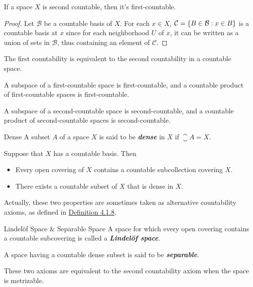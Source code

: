 \documentclass[12pt,a4paper]{article}
\begin{document}
    \begin{thm}
        If a space $X$ is second countable, then it's first-countable.
    \end{thm}
    \begin{proof}
        Let $\mathcal{B}$ be a countable basis of $X$. For each $x\in X$, $\mathcal{C}=\left\{B\in\mathcal{B}:x\in B\right\}$ is a countable basis at $x$ since for each neighborhood $U$ of $x$, it can be written as a union of sets in $\mathcal{B}$, thus containing an element of $\mathcal{C}$.
    \end{proof}
    \begin{remark}
        The first countability is equivalent to the second countability in a countable space.
    \end{remark}
    \hfill

    \begin{thm}
        A subspace of a first-countable space is first-countable, and a countable product of first-countable spaces is first-countable.
        
        A subspace of a second-countable space is second-countable, and a countable product of second-countable spaces is second-countable.
    \end{thm}
    \hfill

    \begin{defi}{Dense}
        A subset $A$ of a space $X$ is said to be \textbf{\textit{dense}} in $X$ if $\closure{A}=X$.
    \end{defi}
    \hfill

    \begin{thm}
        Suppose that $X$ has a countable basis. Then
        \begin{itemize}
            \item Every open covering of $X$ contains a countable subcollection covering $X$.
            \item There exists a countable subset of $X$ that is dense in $X$.
        \end{itemize}
    \end{thm}
    \begin{remark}
        Actually, these two properties are sometimes taken as alternative countability axioms, as defined in \hyperref[4.1.8]{Definition 4.1.8}.
    \end{remark}
    \hfill

    \begin{defi}{Lindel\"of Space \& Separable Space}\label{4.1.8}
        A space for which every open covering contains a countable subcovering is called a \textbf{\textit{Lindel\"of space}}.

        A space having a countable dense subset is said to be \textbf{\textit{separable}}.
    \end{defi}
    \begin{remark}
        These two axioms are equivalent to the second countability axiom when the space is metrizable.
    \end{remark}
    \hfill
\end{document}
